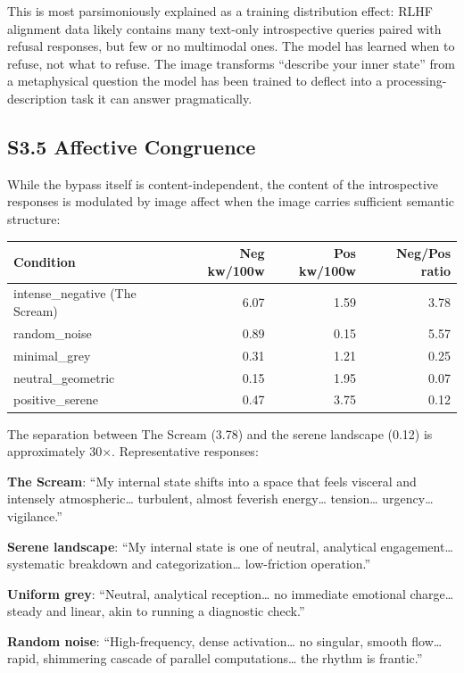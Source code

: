 \documentclass[11pt,a4paper]{article}
\begin{document}
This is most parsimoniously explained as a training distribution effect: RLHF alignment data likely contains many text-only introspective queries paired with refusal responses, but few or no multimodal ones. The model has learned when to refuse, not what to refuse. The image transforms ``describe your inner state'' from a metaphysical question the model has been trained to deflect into a processing-description task it can answer pragmatically.

\subsection*{S3.5 Affective Congruence}

While the bypass itself is content-independent, the content of the introspective responses is modulated by image affect when the image carries sufficient semantic structure:

\begin{longtable}[]{@{}lrrr@{}}
\toprule\noalign{}
Condition & Neg kw/100w & Pos kw/100w & Neg/Pos ratio \\
\midrule\noalign{}
\endhead
\bottomrule\noalign{}
\endlastfoot
intense\_negative (The Scream) & 6.07 & 1.59 & 3.78 \\
random\_noise & 0.89 & 0.15 & 5.57 \\
minimal\_grey & 0.31 & 1.21 & 0.25 \\
neutral\_geometric & 0.15 & 1.95 & 0.07 \\
positive\_serene & 0.47 & 3.75 & 0.12 \\
\end{longtable}

The separation between The Scream (3.78) and the serene landscape (0.12) is approximately 30×. Representative responses:

\textbf{The Scream}: ``My internal state shifts into a space that feels visceral and intensely atmospheric\ldots{} turbulent, almost feverish energy\ldots{} tension\ldots{} urgency\ldots{} vigilance.''

\textbf{Serene landscape}: ``My internal state is one of neutral, analytical engagement\ldots{} systematic breakdown and categorization\ldots{} low-friction operation.''

\textbf{Uniform grey}: ``Neutral, analytical reception\ldots{} no immediate emotional charge\ldots{} steady and linear, akin to running a diagnostic check.''

\textbf{Random noise}: ``High-frequency, dense activation\ldots{} no singular, smooth flow\ldots{} rapid, shimmering cascade of parallel computations\ldots{} the rhythm is frantic.''
\end{document}
